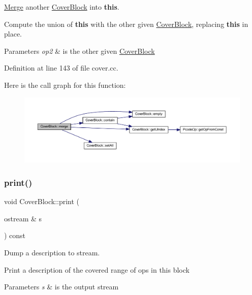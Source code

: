 \mbox{\hyperlink{class_merge}{Merge}} another \mbox{\hyperlink{class_cover_block}{Cover\+Block}} into {\bfseries{this}}. 

Compute the union of {\bfseries{this}} with the other given \mbox{\hyperlink{class_cover_block}{Cover\+Block}}, replacing {\bfseries{this}} in place. 
\begin{DoxyParams}{Parameters}
{\em op2} & is the other given \mbox{\hyperlink{class_cover_block}{Cover\+Block}} \\
\hline
\end{DoxyParams}


Definition at line 143 of file cover.\+cc.

Here is the call graph for this function\+:
\nopagebreak
\begin{figure}[H]
\begin{center}
\leavevmode
\includegraphics[width=350pt]{class_cover_block_ad686102d99fec796c67db2778d9981e5_cgraph}
\end{center}
\end{figure}
\mbox{\label{class_cover_block_a58f570ab514cdabc3b9671cdb08911e7}} 
\subsubsection{\texorpdfstring{print()}{print()}}
{\footnotesize\ttfamily void Cover\+Block\+::print (\begin{DoxyParamCaption}\item[{ostream \&}]{s }\end{DoxyParamCaption}) const}



Dump a description to stream. 

Print a description of the covered range of ops in this block 
\begin{DoxyParams}{Parameters}
{\em s} & is the output stream \\
\hline
\end{DoxyParams}


